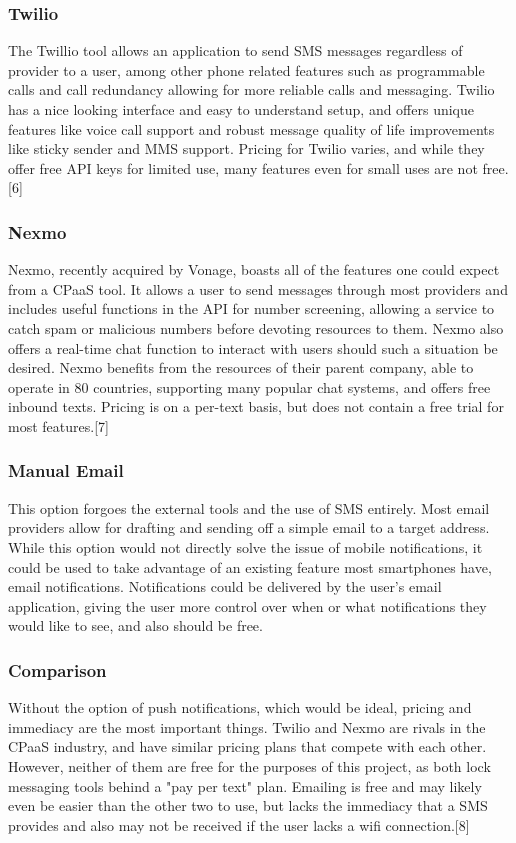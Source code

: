\documentclass[onecolumn, draftclsnofoot,10pt, compsoc]{IEEEtran}
\begin{document}
\subsubsection{Twilio}
The Twillio tool allows an application to send SMS messages regardless of provider to a user, among other phone related features such as programmable calls and call redundancy allowing
for more reliable calls and messaging. Twilio has a nice looking interface and easy to understand setup, and offers unique features like voice call support and robust 
message quality of life improvements like sticky sender and MMS support. Pricing for Twilio varies, and while they offer free API keys for limited use, many features even for small uses 
are not free.[6]
\subsubsection{Nexmo}
Nexmo, recently acquired by Vonage, boasts all of the features one could expect from a CPaaS tool. It allows a user to send messages through most providers and includes useful functions in
the API for number screening, allowing a service to catch spam or malicious numbers before devoting resources to them. Nexmo also offers a real-time chat function to interact with users 
should such a situation be desired. Nexmo benefits from the resources of their parent company, able to operate in 80 countries, supporting many popular chat systems, and offers free inbound texts.
Pricing is on a per-text basis, but does not contain a free trial for most features.[7]
\subsubsection{Manual Email}
This option forgoes the external tools and the use of SMS entirely. Most email providers allow for drafting and sending off a simple email to a target address. While this option would not 
directly solve the issue of mobile notifications, it could be used to take advantage of an existing feature most smartphones have, email notifications. Notifications could be delivered by the user's 
email application, giving the user more control over when or what notifications they would like to see, and also should be free. 
\subsubsection{Comparison}
Without the option of push notifications, which would be ideal, pricing and immediacy are the most important things. Twilio and Nexmo are rivals in the CPaaS industry, and have similar pricing plans that
compete with each other. However, neither of them are free for the purposes of this project, as both lock messaging tools behind a "pay per text" plan. Emailing is free and may likely even be easier 
than the other two to use, but lacks the immediacy that a SMS provides and also may not be received if the user lacks a wifi connection.[8]
\end{document}
